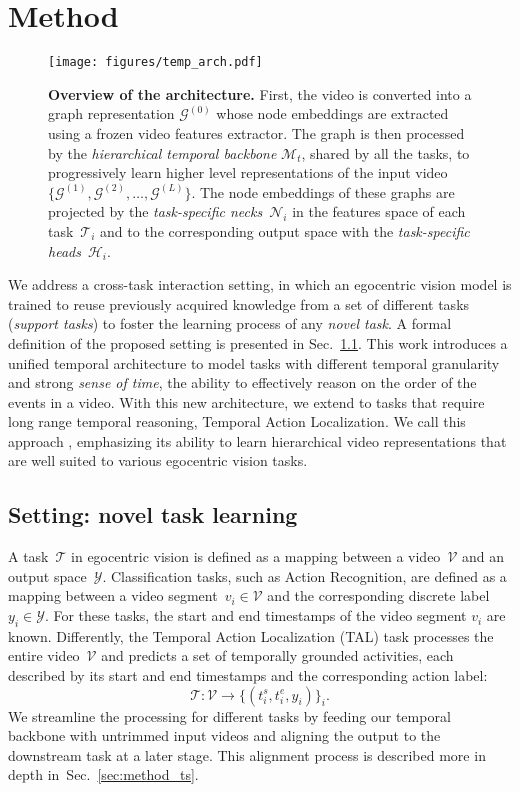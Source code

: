 \section{Method}\label{sec:method}

\begin{figure}[t]
    \centering
    \texttt{[image: figures/temp\_arch.pdf]}
    \caption{
        \textbf{Overview of the \ours architecture.}
        First, the video is converted into a graph representation $\mathcal{G}^{(0)}$ whose node embeddings are extracted using a frozen video features extractor.
        The graph is then processed by the \emph{hierarchical temporal backbone} $\mathcal{M}_t$, shared by all the tasks, to progressively learn higher level representations of the input video~$\{\mathcal{G}^{(1)}, \mathcal{G}^{(2)}, \dots, \mathcal{G}^{(L)}\}$.
        The node embeddings of these graphs are projected by the \emph{task-specific necks}~$\mathcal{N}_i$ in the features space of each task~$\mathcal{T}_i$ and to the corresponding output space with the \emph{task-specific heads}~$\mathcal{H}_i$.
    }\label{fig:architecture}
\end{figure}

We address a cross-task interaction setting, in which an egocentric vision model is trained to reuse previously acquired knowledge from a set of different tasks (\emph{support tasks}) to foster the learning process of any \emph{novel task}.
%
A formal definition of the proposed setting is presented in Sec.~\ref{sec:method_setting}.
% 
This work introduces a unified temporal architecture to model tasks with different temporal granularity and strong \emph{sense of time}, \ie the ability to effectively reason on the order of the events in a video.
%
With this new architecture, we extend \ourscvpr to tasks that require long range temporal reasoning, \eg Temporal Action Localization.
%
We call this approach \ours, emphasizing its ability to learn hierarchical video representations that are well suited to various egocentric vision tasks.

\subsection{Setting: novel task learning}\label{sec:method_setting}
A task~$\mathcal{T}$ in egocentric vision is defined as a mapping between a video~$\mathcal{V}$ and an output space~$\mathcal{Y}$.
%
Classification tasks, such as Action Recognition, are defined as a mapping between a video segment~$v_i \in \mathcal{V}$ and the corresponding discrete label~$y_i \in \mathcal{Y}$. For these tasks, the start and end timestamps of the video segment $v_i$ are known.
% 
Differently, the Temporal Action Localization (TAL) task processes the entire video~$\mathcal{V}$ and predicts a set of temporally grounded activities, each described by its start and end timestamps and the corresponding action label: $$\mathcal{T}: \mathcal{V} \to \{(t_i^s, t_i^e, y_i)\}_i.$$
%
We streamline the processing for different tasks by feeding our temporal backbone with untrimmed input videos and aligning the output to the downstream task at a later stage.
This alignment process is described more in depth in~Sec.~\ref{sec:method_ts}.

